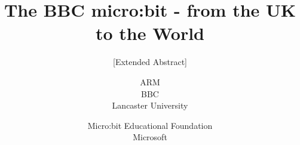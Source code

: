 \documentclass{research4cacm}
\begin{document}
%

\title{The BBC micro:bit - from the UK to the World
%
}
\subtitle{[Extended Abstract]
}
%
%
%
%
%
%
\author{
%
%
\alignauthor ARM \\
\alignauthor BBC \\
\alignauthor Lancaster University \\
\and 
\alignauthor Micro:bit Educational Foundation \\
\alignauthor Microsoft \\
}
\end{document}
